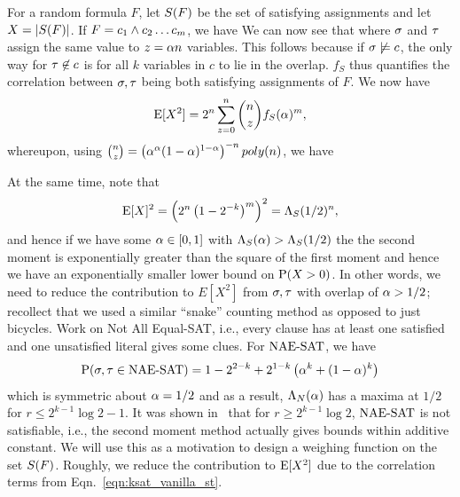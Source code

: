 \documentclass[letterpaper, 10pt, twocolumn, reqno]{amsart}
\begin{document}
For a random formula $F$, let $\sf$ be the set of satisfying assignments and let $X = \abs{\sf}$. If $F = c_1 \aand c_2 \ldots c_m$, we have
We can now see that
where $\s$ and $\t$ assign the same value to $z = \a n$ variables. This follows because if $\s \not\sat c$, the only way for $\t \not\in c$ is for all $k$ variables in $c$ to lie in the overlap. $f_S$ thus quantifies the correlation between $\s,\t$ being both satisfying assignments of $F$. We now have
$$
\E[X^2] = 2^n \sum_{z=0}^n \binom{n}{z} f_S(\a)^m,
$$
whereupon, using $\binom{n}{z} = \rbrac{\a^\a (1-\a)^{1-\a}}^{-n} poly(n)$, we have

At the same time, note that
$$
\E[X]^2 = \rbrac{2^n \rbrac{1 - 2^{-k}}^m }^2 = \L_S(1/2)^n,
$$
and hence if we have some $\a \in [0,1]$ with $\L_S(\a) > \L_S(1/2)$ the
the second moment is exponentially greater than the square of the first moment and hence we have an exponentially smaller lower bound on $\P(X > 0)$. In
other words, we need to reduce the contribution to $E[X^2]$ from $\s,\t$ with overlap of $\a > 1/2$; recollect that we used a similar ``snake'' counting method as opposed to just bicycles. Work on Not All Equal-SAT, i.e., every clause has at
least one satisfied and one unsatisfied literal gives some clues. For $\NAESAT$, we have
$$
\P(\s,\t \in \NAESAT) = 1 - 2^{2-k} + 2^{1-k} \rbrac{\a^k + (1-\a)^k}
$$
which is symmetric about $\a = 1/2$ and as a result, $\L_N(\a)$ has a maxima at $1/2$ for $r \leq 2^{k-1} \log2 -1$. It was shown in~\cite{achlioptas2002asymptotic} that for $r \geq 2^{k-1} \log2$, $\NAESAT$ is not satisfiable, i.e., the second moment method actually gives bounds within additive constant. We will use this as a motivation to design a weighing function on the set $\sf$. Roughly, we reduce the contribution to $\E[X^2]$ due to the correlation terms from Eqn.~\eqref{eqn:ksat_vanilla_st}.
\end{document}
